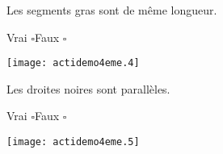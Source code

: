\par\begin{multicols}{2}
\begin{center}
Les segments gras sont de même longueur.
\par
{\sc Vrai} $\square$\hfill{\sc Faux} $\square$
\par\texttt{[image: actidemo4eme.4]}
\end{center}
\par\vskip5cm
\begin{center}
Les droites noires sont parallèles.
\par
{\sc Vrai} $\square$\hfill{\sc Faux} $\square$
\par\texttt{[image: actidemo4eme.5]}
\end{center}
\end{multicols}